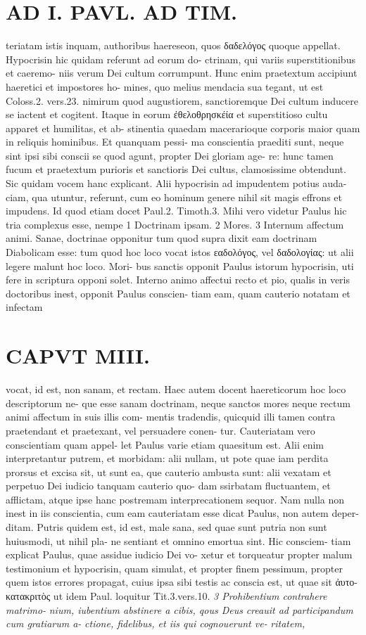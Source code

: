 \documentclass{article}
\begin{document}
\begin{pages}
\section*{AD I. PAVL. AD TIM. }
\marginpar{[ p.184 ]}teriatam istis inquam, authoribus haereseon, quos δαδελόγος quoque appellat. Hypocrisin hic quidam referunt ad eorum do- ctrinam, qui variis superstitionibus et caeremo- niis verum Dei cultum corrumpunt. Hunc enim praetextum accipiunt haeretici et impostores ho- mines, quo melius mendacia sua tegant, ut est Coloss.2. vers.23. nimirum quod augustiorem, sanctioremque Dei cultum inducere se iactent et cogitent. Itaque in eorum ἐθελοθρησκέία et superstitioso cultu apparet et humilitas, et ab- stinentia quaedam macerarioque corporis maior quam in reliquis hominibus. Et quanquam pessi- ma conscientia praediti sunt, neque sint ipsi sibi conscii se quod agunt, propter Dei gloriam age- re: hunc tamen fucum et praetextum purioris et sanctioris Dei cultus, clamosissime obtendunt. Sic quidam vocem hanc explicant. Alii hypocrisin ad impudentem potius auda- ciam, qua utuntur, referunt, cum eo hominum genere nihil sit magis effrons et impudens. Id quod etiam docet Paul.2. Timoth.3. Mihi vero videtur Paulus hic tria complexus esse, nempe 1 Doctrinam ipsam. 2 Mores. 3 Internum affectum animi. Sanae, doctrinae opponitur tum quod supra dixit eam doctrinam Diabolicam esse: tum quod hoc loco vocat istos εαδολόγος, vel δαδολογίας: ut alii legere malunt hoc loco. Mori- bus sanctis opponit Paulus istorum hypocrisin, uti fere in scriptura opponi solet. Interno animo affectui recto et pio, qualis in veris doctoribus inest, opponit Paulus conscien- tiam eam, quam cauterio notatam et infectam 
\section*{CAPVT  MIII. }
\marginpar{[ p.185 ]}vocat, id est, non sanam, et rectam. Haec autem docent haereticorum hoc loco descriptorum ne- que esse sanam doctrinam, neque sanctos mores neque rectum animi affectum in suis illis com- mentis tradendis, quicquid illi tamen contra praetendant et praetexant, vel persuadere conen- tur. Cauteriatam vero conscientiam quam appel- let Paulus varie etiam quaesitum est. Alii enim interpretantur putrem, et morbidam: alii nullam, ut pote quae iam perdita prorsus et excisa sit, ut sunt ea, que cauterio ambusta sunt: alii vexatam et perpetuo Dei iudicio tanquam cauterio quo- dam ssirbatam fluctuantem, et afflictam, atque ipse hanc postremam interprecationem sequor. Nam nulla non inest in iis conscientia, cum eam cauteriatam esse dicat Paulus, non autem deper- ditam. Putris quidem est, id est, male sana, sed quae sunt putria non sunt huiusmodi, ut nihil pla- ne sentiant et omnino emortua sint. Hic consciem- tiam explicat Paulus, quae assidue iudicio Dei vo- xetur et torqueatur propter malum testimonium et hypocrisin, quam simulat, et propter finem pessimum, propter quem istos errores propagat, cuius ipsa sibi testis ac conscia est, ut quae sit ἀυτο- κατακριτὸς ut idem Paul. loquitur Tit.3.vers.10. \textit{3 Prohibentium contrahere matrimo-} \textit{nium, iubentium abstinere a cibis, qous Deus} \textit{creauit ad participandum cum gratiarum a-} \textit{ctione, fidelibus, et iis qui cognouerunt ve-} \textit{ritatem,} 

\end{pages}
\end{document}
